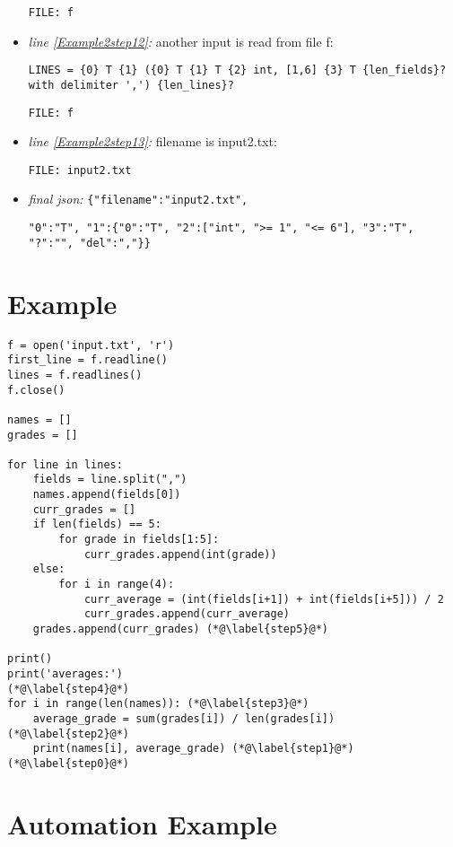 \documentclass[11pt]{article}
\begin{document}
\begin{itemize}
\verb|FILE: f|

\item \textit{line \ref{Example2step12}:} another input is read from file f:

\verb|LINES = {0} T {1} ({0} T {1} T {2} int, [1,6] {3} T {len_fields}? with delimiter ',') {len_lines}?|

\verb|FILE: f|

\item \textit{line \ref{Example2step13}:} filename is input2.txt:

\verb|FILE: input2.txt|

\item \textit{final json:} \verb|{"filename":"input2.txt",|

\verb|"0":"T", "1":{"0":"T", "2":["int", ">= 1", "<= 6"], "3":"T", "?":"", "del":","}}|



\end{itemize}
% 
\section{Example}

\begin{lstlisting}
f = open('input.txt', 'r')
first_line = f.readline()
lines = f.readlines()
f.close()

names = []
grades = []

for line in lines:
    fields = line.split(",")
    names.append(fields[0])
    curr_grades = []
    if len(fields) == 5:
        for grade in fields[1:5]:
            curr_grades.append(int(grade))
    else:
        for i in range(4):
            curr_average = (int(fields[i+1]) + int(fields[i+5])) / 2
            curr_grades.append(curr_average)
    grades.append(curr_grades) (*@\label{step5}@*) 

print()
print('averages:')
(*@\label{step4}@*) 
for i in range(len(names)): (*@\label{step3}@*) 
    average_grade = sum(grades[i]) / len(grades[i]) (*@\label{step2}@*) 
    print(names[i], average_grade) (*@\label{step1}@*) 
(*@\label{step0}@*) 
\end{lstlisting}

\section{Automation Example}
\end{document}
